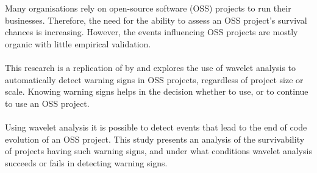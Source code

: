 Many organisations rely on open-source software (OSS) projects to run their
businesses. Therefore, the need for the ability to assess an OSS project's
survival chances is increasing. However, the events influencing OSS projects
are mostly organic with little empirical validation.

\paragraph{}
This research is a replication of \textit{\repltitle} by \replauthor{} and
explores the use of wavelet analysis to automatically detect warning signs in
OSS projects, regardless of project size or scale. Knowing warning signs helps
in the decision whether to use, or to continue to use an OSS project.

\paragraph{}
Using wavelet analysis it is possible to detect events that lead to the end of
code evolution of an OSS project. This study presents an analysis of the
survivability of projects having such warning signs, and under what conditions
wavelet analysis succeeds or fails in detecting warning signs.


\begin{comment}
1. State the problem.
2. State why the problem is a problem.
3. Startling.
4. State the implication of the startling.

See:
Ralph E. Johnson, Kent Beck, Grady Booch, William R. Cook, Richard P. Gabriel,
and Rebecca Wirfs-Brock.
How to Get a Paper Accepted at OOPSLA.
In Timlynn Babitsky and Jim Salmons, editors,
Proceedings of the Eighth Annual Conference on Object-Oriented Programming Systems, Languages and Applications, OOPSLA,
pages 429–436. ACM, 1993.
\end{comment}
